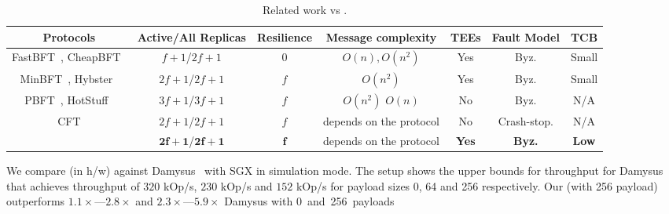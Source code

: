 \begin{table*}[h!]
\small

\begin{center}
\begin{tabular}{ |c|c|c|c|c|c|c| } 
 \hline
 Protocols & Active/All Replicas & Resilience & Message complexity & TEEs & Fault Model & TCB \\ [0.5ex] \hline \hline
 FastBFT~\cite{DBLP:journals/corr/LiuLKA16a}, CheapBFT~\cite{10.1145/2168836.2168866} & $f+1$/$2f+1$ & $0$ & $O(n), O(n^2)$ & Yes & Byz. & Small\\
 MinBFT~\cite{minBFT}, Hybster~\cite{hybster} & $2f+1$/$2f+1$ & $f$ &  $O(n^2)$ & Yes & Byz. & Small\\
 PBFT~\cite{Castro:2002}, HotStuff~\cite{DBLP:journals/corr/abs-1803-05069} & $3f+1$/$3f+1$ & $f$ & $O(n^2)$ $O(n)$ & No & Byz. & N/A\\
 CFT & $2f+1$/$2f+1$ & $f$ & depends on the protocol & No & Crash-stop. & N/A\\
 {\bf \projecttitle{}} & $\mathbf{2f+1}$/$\mathbf{2f+1}$ & ${\mathbf{f}}$ & depends on the protocol & \bf{Yes} & \bf{Byz.} & \bf{Low}\\ 
 \hline
\end{tabular}
\end{center}
\caption{Related work vs \projecttitle{}.}
\label{tab:recipe_vs_bft}
\end{table*}
\fi



 We compare \projecttitle{} (in h/w) against Damysus~\cite{10.1145/3492321.3519568} with SGX in simulation mode. The setup shows the upper bounds for throughput for Damysus that achieves throughput of $320$ kOp/s, $230$ kOp/s and	$152$ kOp/s for payload sizes \SI{0}{\byte}, \SI{64}{\byte} and \SI{256}{\byte} respectively. Our \projecttitle{} (with \SI{256}{\byte} payload) outperforms $1.1\times$---$2.8\times$ and $2.3\times$---$5.9\times$ Damysus with \SI{0} and \SI{256}{\byte} payloads.%



